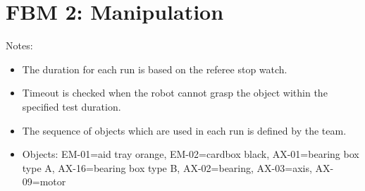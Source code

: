 \section*{FBM 2: Manipulation}


\noindent Notes:
\begin{itemize}
\item The duration for each run is based on the referee stop watch.
\item Timeout is checked when the robot cannot grasp the object within the specified test duration.
\item The sequence of objects which are used in each run is defined by the team.
\item Objects: EM-01=aid tray orange, EM-02=cardbox black, AX-01=bearing box type A, AX-16=bearing box type B, AX-02=bearing, AX-03=axis, AX-09=motor
\end{itemize}

\vspace{0.5cm}


\newpage


